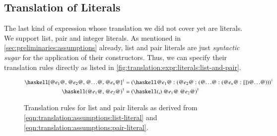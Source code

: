 \subsection{Translation of Literals} \label{sec:translation:expr:literals}
The last kind of expression whose translation we did not cover yet are literals.
We support list, pair and integer literals.
As mentioned in \autoref{sec:preliminaries:assumptions} already, list and pair literals are just \textit{syntactic sugar} for the application of their constructors.
Thus, we can specify their translation rules directly as listed in \autoref{fig:translation:expr:literals:list-and-pair}.

\begin{figure}[H]
  \begin{align*}
    \toCoq{\haskellM{[@$e_1$@, @$e_2$@, @$\ldots$@, @$e_n$@]}}
    &= \toCoq{(\haskellM{@$e_1$@ : (@$e_2$@ : (@$\ldots$@ : (@$e_n$@ : [])@$\ldots$@))})}
    \\
    \toCoq{\haskellM{(@$e_1$@, @$e_2$@)}}
    &= \toCoq{(\haskellM{(,) @$e_1$@ @$e_2$@})}
  \end{align*}
  \caption{Translation rules for list and pair literals as derived from \autoref{eqn:translation:assumptions:list-literal} and \autoref{eqn:translation:assumptions:pair-literal}.}
  \label{fig:translation:expr:literals:list-and-pair}
\end{figure}

